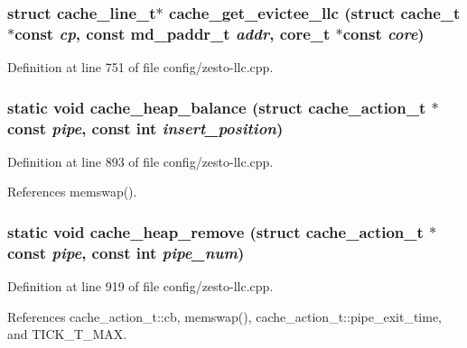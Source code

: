 \subsubsection[{cache\_\-get\_\-evictee\_\-llc}]{\setlength{\rightskip}{0pt plus 5cm}struct {\bf cache\_\-line\_\-t}$\ast$ cache\_\-get\_\-evictee\_\-llc (struct {\bf cache\_\-t} $\ast$const  {\em cp}, \/  const {\bf md\_\-paddr\_\-t} {\em addr}, \/  {\bf core\_\-t} $\ast$const  {\em core})\hspace{0.3cm}{\tt  [read]}}\label{config_2zesto-llc_8cpp_edb31cd34331b82f67b46e4117a3fb7a}




Definition at line 751 of file config/zesto-llc.cpp.
\subsubsection[{cache\_\-heap\_\-balance}]{\setlength{\rightskip}{0pt plus 5cm}static void cache\_\-heap\_\-balance (struct {\bf cache\_\-action\_\-t} $\ast$const  {\em pipe}, \/  const int {\em insert\_\-position})\hspace{0.3cm}{\tt  [static]}}\label{config_2zesto-llc_8cpp_0784d914ca0e1dc0f651a456830f94ed}




Definition at line 893 of file config/zesto-llc.cpp.

References memswap().
\subsubsection[{cache\_\-heap\_\-remove}]{\setlength{\rightskip}{0pt plus 5cm}static void cache\_\-heap\_\-remove (struct {\bf cache\_\-action\_\-t} $\ast$const  {\em pipe}, \/  const int {\em pipe\_\-num})\hspace{0.3cm}{\tt  [static]}}\label{config_2zesto-llc_8cpp_672e06f81a893ac6af2c4fd4948069ed}




Definition at line 919 of file config/zesto-llc.cpp.

References cache\_\-action\_\-t::cb, memswap(), cache\_\-action\_\-t::pipe\_\-exit\_\-time, and TICK\_\-T\_\-MAX.
